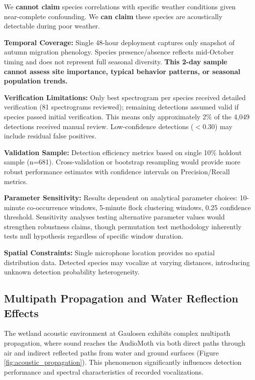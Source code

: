 \documentclass[twocolumn]{article}
\begin{document}
We \textbf{cannot claim} species correlations with specific weather conditions given near-complete confounding. We \textbf{can claim} these species are acoustically detectable during poor weather.

\textbf{Temporal Coverage:} Single 48-hour deployment captures only snapshot of autumn migration phenology. Species presence/absence reflects mid-October timing and does not represent full seasonal diversity. \textbf{This 2-day sample cannot assess site importance, typical behavior patterns, or seasonal population trends.}

\textbf{Verification Limitations:} Only best spectrogram per species received detailed verification (81 spectrograms reviewed); remaining detections assumed valid if species passed initial verification. This means only approximately 2\% of the 4,049 detections received manual review. Low-confidence detections ($<$0.30) may include residual false positives.

\textbf{Validation Sample:} Detection efficiency metrics based on single 10\% holdout sample (n=681). Cross-validation or bootstrap resampling would provide more robust performance estimates with confidence intervals on Precision/Recall metrics.

\textbf{Parameter Sensitivity:} Results dependent on analytical parameter choices: 10-minute co-occurrence windows, 5-minute flock clustering windows, 0.25 confidence threshold. Sensitivity analyses testing alternative parameter values would strengthen robustness claims, though permutation test methodology inherently tests null hypothesis regardless of specific window duration.

\textbf{Spatial Constraints:} Single microphone location provides no spatial distribution data. Detected species may vocalize at varying distances, introducing unknown detection probability heterogeneity.

\subsection{Multipath Propagation and Water Reflection Effects}

The wetland acoustic environment at Gaulosen exhibits complex multipath propagation, where sound reaches the AudioMoth via both direct paths through air and indirect reflected paths from water and ground surfaces (Figure \ref{fig:acoustic_propagation}). This phenomenon significantly influences detection performance and spectral characteristics of recorded vocalizations.
\end{document}
